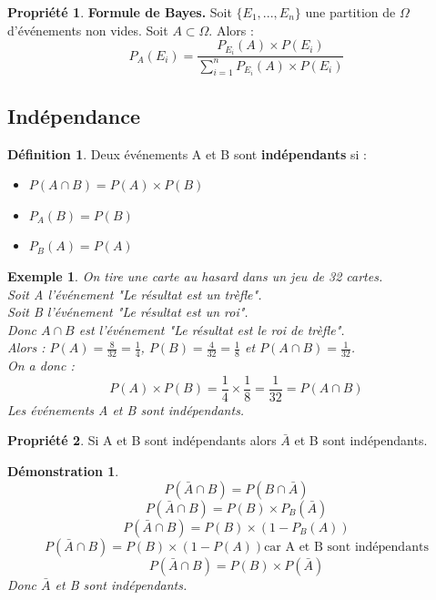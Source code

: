 \documentclass[a4paper,12pt,final]{article}
\newtheorem{Ex}{Exemple}[section]
\newtheorem{Proof}{Démonstration}[section]
\theoremstyle{theorem}
\theoremstyle{definition}
\newtheorem{Propriete}{Propriété}[section]
\theoremstyle{definition}
\theoremstyle{definition}
\newtheorem{Def}{Définition}[section]
\begin{document}
		\begin{Propriete}
			\textbf{Formule de Bayes.} Soit $\{E_{1},...,E_{n}\}$ une partition de $\Omega$ d'événements non vides. Soit $A\subset \Omega$. Alors : 
			\[P_{A}(E_{i}) = \frac{P_{E_{i}}(A) \times P(E_{i})}{\sum_{i=1}^{n}P_{E_{i}}(A) \times P(E_{i}) }\]
		\end{Propriete}
	
	\subsection{Indépendance}
		\begin{Def}
			Deux événements A et B sont \textbf{indépendants} si : \\
			\begin{itemize}
				\item $P(A\cap B) = P(A) \times P(B)$
				\item $P_{A}(B) = P(B)$
				\item $P_{B}(A) = P(A)$
			\end{itemize}
		\end{Def}
	
		\begin{Ex}
			On tire une carte au hasard dans un jeu de 32 cartes. \\
			Soit A l'événement "Le résultat est un trèfle". \\
			Soit B l'événement "Le résultat est un roi". \\
			Donc $A\cap B$ est l'événement "Le résultat est le roi de trèfle". \\
			Alors : $P(A) = \frac{8}{32} = \frac{1}{4}$, $P(B) = \frac{4}{32} = \frac{1}{8}$ et $P(A\cap B) = \frac{1}{32}$. \\
			On a donc : 
			\[P(A) \times P(B) = \frac{1}{4} \times \frac{1}{8} = \frac{1}{32} = P(A\cap B)\]
			Les événements A et B sont indépendants.
		\end{Ex}
	
		\begin{Propriete}
			Si A et B sont indépendants alors $\bar{A}$ et B sont indépendants.
		\end{Propriete}	
	
		\begin{Proof}
			\[P(\bar{A}\cap B) = P(B\cap \bar{A})\]
			\[P(\bar{A}\cap B) = P(B) \times P_{B}(\bar{A})\]
			\[P(\bar{A}\cap B) = P(B) \times (1 - P_{B}(A))\]
			\[P(\bar{A}\cap B) = P(B) \times (1 - P(A)) \text{car A et B sont indépendants}\]
			\[P(\bar{A}\cap B) = P(B) \times P(\bar{A})\]
			Donc $\bar{A}$ et B sont indépendants.
		\end{Proof}
	
\end{document}
